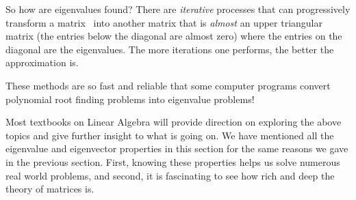 So how are eigenvalues found? There are \textit{iterative} processes that can progressively transform a matrix \tta\ into another matrix that is \textit{almost} an upper triangular matrix (the entries below the diagonal are almost zero) where the entries on the diagonal are the eigenvalues. The more iterations one performs, the better the approximation is. 

These methods are so fast and reliable that some computer programs convert polynomial root finding problems into eigenvalue problems!

Most textbooks on Linear Algebra will provide direction on exploring the above topics and give further insight to what is going on. We have mentioned all the eigenvalue and eigenvector properties in this section for the same reasons we gave in the previous section. First, knowing these properties helps us solve numerous real world problems, and second, it is fascinating to see how rich and deep the theory of matrices is.

